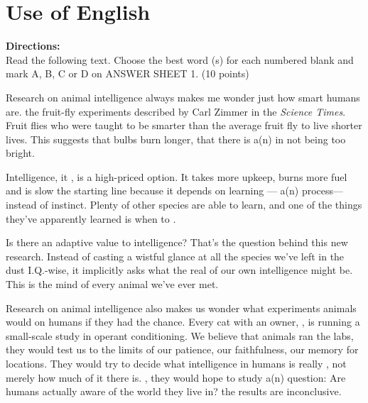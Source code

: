 




\section{Use of English}

\noindent
\textbf{Directions:}\\
Read the following text. Choose the best word (s) for each numbered blank
and mark A, B, C or D on ANSWER SHEET 1. (10 points)




\TiGanSpace


Research on animal intelligence always makes me wonder just how smart
humans are. \cloze the fruit-fly experiments described by Carl
Zimmer in the \emph{Science Times}. Fruit flies who were taught to be
smarter than the average fruit fly \cloze to live shorter lives.
This suggests that \cloze bulbs burn longer, that there is
a(n) \cloze in not being too bright.


Intelligence, it \cloze , is a high-priced option. It takes more
upkeep, burns more fuel and is slow \cloze the starting line
because it depends on learning --- a(n) \cloze process--- instead
of instinct. Plenty of other species are able to learn, and one of the
things they've apparently learned is when to \cloze.

Is there an adaptive value to \cloze intelligence? That's the
question behind this new research. Instead of casting a wistful
glance \cloze at all the species we've left in the dust
I.Q.-wise, it implicitly asks what the real \cloze of our own
intelligence might be. This is \cloze the mind of every animal
we've ever met.

Research on animal intelligence also makes us wonder what experiments
animals would \cloze on humans if they had the chance. Every cat
with an owner, \cloze , is running a small-scale study in
operant conditioning. We believe that \cloze animals ran the
labs, they would test us to \cloze the limits of our patience,
our faithfulness, our memory for locations. They would try to decide
what intelligence in humans is really \cloze , not merely how
much of it there is. \cloze , they would hope to study
a(n) \cloze question: Are humans actually aware of the world
they live in? \cloze the results are inconclusive.




\newpage


